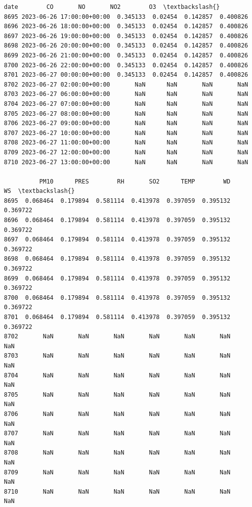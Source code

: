 \documentclass[11pt]{article}
\makeatletter
\newcommand{\boxspacing}{\kern\kvtcb@left@rule\kern\kvtcb@boxsep}
\newcommand{\prompt}[4]{
        {\ttfamily\llap{{\color{#2}[#3]:\hspace{3pt}#4}}\vspace{-\baselineskip}}
    }
\makeatother
\begin{document}
            \begin{tcolorbox}[breakable, size=fbox, boxrule=.5pt, pad at break*=1mm, opacityfill=0]
\prompt{Out}{outcolor}{48}{\boxspacing}
\begin{Verbatim}[commandchars=\\\{\}]
                          date        CO       NO       NO2        O3  \textbackslash{}
8695 2023-06-26 17:00:00+00:00  0.345133  0.02454  0.142857  0.400826
8696 2023-06-26 18:00:00+00:00  0.345133  0.02454  0.142857  0.400826
8697 2023-06-26 19:00:00+00:00  0.345133  0.02454  0.142857  0.400826
8698 2023-06-26 20:00:00+00:00  0.345133  0.02454  0.142857  0.400826
8699 2023-06-26 21:00:00+00:00  0.345133  0.02454  0.142857  0.400826
8700 2023-06-26 22:00:00+00:00  0.345133  0.02454  0.142857  0.400826
8701 2023-06-27 00:00:00+00:00  0.345133  0.02454  0.142857  0.400826
8702 2023-06-27 02:00:00+00:00       NaN      NaN       NaN       NaN
8703 2023-06-27 06:00:00+00:00       NaN      NaN       NaN       NaN
8704 2023-06-27 07:00:00+00:00       NaN      NaN       NaN       NaN
8705 2023-06-27 08:00:00+00:00       NaN      NaN       NaN       NaN
8706 2023-06-27 09:00:00+00:00       NaN      NaN       NaN       NaN
8707 2023-06-27 10:00:00+00:00       NaN      NaN       NaN       NaN
8708 2023-06-27 11:00:00+00:00       NaN      NaN       NaN       NaN
8709 2023-06-27 12:00:00+00:00       NaN      NaN       NaN       NaN
8710 2023-06-27 13:00:00+00:00       NaN      NaN       NaN       NaN

          PM10      PRES        RH       SO2      TEMP        WD        WS  \textbackslash{}
8695  0.068464  0.179894  0.581114  0.413978  0.397059  0.395132  0.369722
8696  0.068464  0.179894  0.581114  0.413978  0.397059  0.395132  0.369722
8697  0.068464  0.179894  0.581114  0.413978  0.397059  0.395132  0.369722
8698  0.068464  0.179894  0.581114  0.413978  0.397059  0.395132  0.369722
8699  0.068464  0.179894  0.581114  0.413978  0.397059  0.395132  0.369722
8700  0.068464  0.179894  0.581114  0.413978  0.397059  0.395132  0.369722
8701  0.068464  0.179894  0.581114  0.413978  0.397059  0.395132  0.369722
8702       NaN       NaN       NaN       NaN       NaN       NaN       NaN
8703       NaN       NaN       NaN       NaN       NaN       NaN       NaN
8704       NaN       NaN       NaN       NaN       NaN       NaN       NaN
8705       NaN       NaN       NaN       NaN       NaN       NaN       NaN
8706       NaN       NaN       NaN       NaN       NaN       NaN       NaN
8707       NaN       NaN       NaN       NaN       NaN       NaN       NaN
8708       NaN       NaN       NaN       NaN       NaN       NaN       NaN
8709       NaN       NaN       NaN       NaN       NaN       NaN       NaN
8710       NaN       NaN       NaN       NaN       NaN       NaN       NaN


\end{Verbatim}
\end{tcolorbox}
\end{document}
